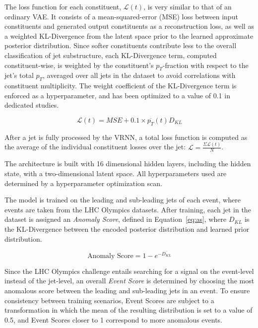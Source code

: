 \documentclass[letterpaper,11pt]{article}
\begin{document}
The loss function for each constituent, $\mathcal{L}(t)$, is very similar to that of an ordinary VAE. 
It consists of a mean-squared-error (MSE) loss between input constituents and generated output constituents as a reconstruction loss, as well as a weighted KL-Divergence from the latent space prior to the learned approximate posterior distribution. 
Since softer constituents contribute less to the overall classification of jet substructure, each KL-Divergence term, computed constituent-wise, is weighted by the constituent's $p_{T}$-fraction with respect to the jet's total $p_{T}$, averaged over all jets in the dataset to avoid correlations with constituent multiplicity. 
The weight coefficient of the KL-Divergence term is enforced as a hyperparameter, and has been optimized to a value of 0.1 in dedicated studies. 

\begin{equation}
\mathcal{L}(t)=MSE+0.1 \times \overline{p_T}(t)D_{KL}
\end{equation}

After a jet is fully processed by the VRNN, a total loss function is computed as the average of the individual constituent losses over the jet: $\mathcal{L} = \frac{\Sigma \mathcal{L}(t)}{N}$.

The architecture is built with 16 dimensional hidden layers, including the hidden state, with a two-dimensional latent space. All hyperparameters used are determined by a hyperparameter optimization scan. 

The model is trained on the leading and sub-leading jets of each event, where events are taken from the LHC Olympics datasets. 
After training, each jet in the dataset is assigned an \textit{Anomaly Score}, defined in Equation~\ref{eq:as}, where $D_{KL}$ is the KL-Divergence between the encoded posterior distribution and learned prior distribution.

\begin{equation}
\label{eq:as}
\text{Anomaly Score} = 1 - e^{-\overline{D_{KL}}}
\end{equation}

Since the LHC Olympics challenge entails searching for a signal on the event-level instead of the jet-level, an overall \textit{Event Score} is determined by choosing the most anomalous score between the leading and sub-leading jets in an event. 
To ensure consistency between training scenarios, Event Scores are subject to a transformation in which the mean of the resulting distribution is set to a value of 0.5, and Event Scores closer to 1 correspond to more anomalous events. 
\end{document}
